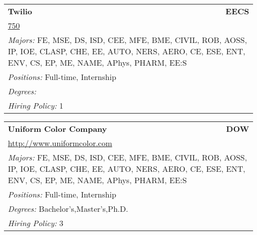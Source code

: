 \documentclass[twoside]{article}
\begin{document}
\begin{center}
\begin{multicols}{3}
\begin{FlushLeft}
\begin{minipage}{.9\columnwidth}\begin{tabularx}{.95\columnwidth}{Xr}
                 {\Large\bf Twilio} & {\Large\bf EECS}\\
    \multicolumn{2}{p{.95\columnwidth}}{\url{750}}\\
    \multicolumn{2}{p{.95\columnwidth}}{\emph{Majors:} FE, MSE, DS, ISD, CEE, MFE, BME, CIVIL, ROB, AOSS, IP, IOE, CLASP, CHE, EE, AUTO, NERS, AERO, CE, ESE, ENT, ENV, CS, EP, ME, NAME, APhys, PHARM, EE:S}\\
    \multicolumn{2}{p{.95\columnwidth}}{\emph{Positions:} Full-time, Internship}\\
    \multicolumn{2}{p{.95\columnwidth}}{\emph{Degrees:} }\\
    \multicolumn{2}{p{.95\columnwidth}}{\emph{Hiring Policy:} 1}\\
    \end{tabularx}
    
\end{minipage}
 
\begin{minipage}{.9\columnwidth}\begin{tabularx}{.95\columnwidth}{Xr}
                 {\Large\bf Uniform Color Company} & {\Large\bf DOW}\\
    \multicolumn{2}{p{.95\columnwidth}}{\url{http://www.uniformcolor.com}}\\
    \multicolumn{2}{p{.95\columnwidth}}{\emph{Majors:} FE, MSE, DS, ISD, CEE, MFE, BME, CIVIL, ROB, AOSS, IP, IOE, CLASP, CHE, EE, AUTO, NERS, AERO, CE, ESE, ENT, ENV, CS, EP, ME, NAME, APhys, PHARM, EE:S}\\
    \multicolumn{2}{p{.95\columnwidth}}{\emph{Positions:} Full-time, Internship}\\
    \multicolumn{2}{p{.95\columnwidth}}{\emph{Degrees:} Bachelor's,Master's,Ph.D.}\\
    \multicolumn{2}{p{.95\columnwidth}}{\emph{Hiring Policy:} 3}\\
    \end{tabularx}
    
\end{minipage}
 

\end{FlushLeft}
\end{multicols}
\end{center}
\end{document}
